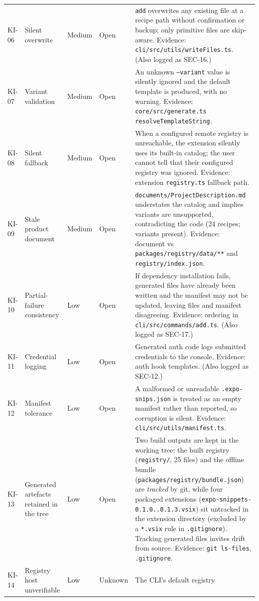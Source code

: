 \begin{longtable}{@{}L{1.2cm}L{3.3cm}L{1.6cm}L{1.1cm}L{6.4cm}@{}}
KI-06 & Silent overwrite & Medium & Open & \texttt{add} overwrites any existing file
at a recipe path without confirmation or backup; only primitive files are
skip-aware. Evidence: \texttt{cli/src/utils/writeFiles.ts}. (Also logged as
SEC-16.) \\
KI-07 & Variant validation & Medium & Open & An unknown \texttt{--variant} value is
silently ignored and the default template is produced, with no warning. Evidence:
\texttt{core/src/generate.ts} \texttt{resolveTemplateString}. \\
KI-08 & Silent fallback & Medium & Open & When a configured remote registry is
unreachable, the extension silently uses its built-in catalog; the user cannot
tell that their configured registry was ignored. Evidence: extension
\texttt{registry.ts} fallback path. \\
KI-09 & Stale product document & Medium & Open & \texttt{documents/ProjectDescription.md}
understates the catalog and implies variants are unsupported, contradicting the
code (24 recipes; variants present). Evidence: document vs
\texttt{packages/registry/data/**} and \texttt{registry/index.json}. \\
KI-10 & Partial-failure consistency & Low & Open & If dependency installation
fails, generated files have already been written and the manifest may not be
updated, leaving files and manifest disagreeing. Evidence: ordering in
\texttt{cli/src/commands/add.ts}. (Also logged as SEC-17.) \\
KI-11 & Credential logging & Low & Open & Generated auth code logs submitted
credentials to the console. Evidence: auth hook templates. (Also logged as
SEC-12.) \\
KI-12 & Manifest tolerance & Low & Open & A malformed or unreadable
\texttt{.expo-snips.json} is treated as an empty manifest rather than reported, so
corruption is silent. Evidence: \texttt{cli/src/utils/manifest.ts}. \\
KI-13 & Generated artefacts retained in the tree & Low & Open & Two build
outputs are kept in the working tree: the built registry
(\texttt{registry/}, 25 files) and the offline bundle
(\texttt{packages/registry/bundle.json}) are \emph{tracked} by git, while four
packaged extensions (\texttt{expo-snippets-0.1.0..0.1.3.vsix}) sit untracked in
the extension directory (excluded by a \texttt{*.vsix} rule in
\texttt{.gitignore}). Tracking generated files invites drift from source.
Evidence: \texttt{git ls-files}, \texttt{.gitignore}. \\
KI-14 & Registry host unverifiable & Low & Unknown & The CLI's default registry

\end{longtable}
